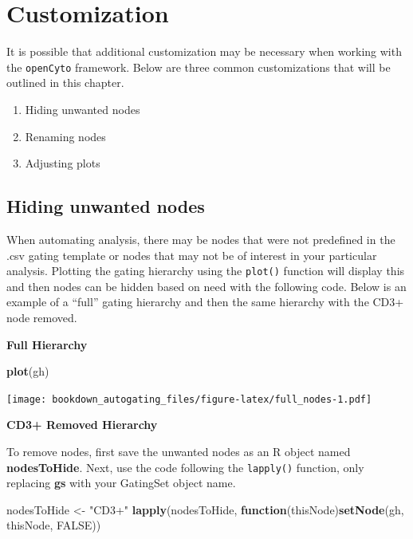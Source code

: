 \documentclass[]{book}
\newenvironment{Shaded}{\begin{snugshade}}{\end{snugshade}}
\newcommand{\ControlFlowTok}[1]{\textcolor[rgb]{0.13,0.29,0.53}{\textbf{#1}}}
\newcommand{\KeywordTok}[1]{\textcolor[rgb]{0.13,0.29,0.53}{\textbf{#1}}}
\newcommand{\NormalTok}[1]{#1}
\newcommand{\OtherTok}[1]{\textcolor[rgb]{0.56,0.35,0.01}{#1}}
\newcommand{\StringTok}[1]{\textcolor[rgb]{0.31,0.60,0.02}{#1}}
\providecommand{\tightlist}{%
  \setlength{\itemsep}{0pt}\setlength{\parskip}{0pt}}
\begin{document}
\hypertarget{customization}{%
\chapter{Customization}\label{customization}}

It is possible that additional customization may be necessary when working with the \texttt{openCyto} framework. Below are three common customizations that will be outlined in this chapter.

\begin{enumerate}
\def\labelenumi{\arabic{enumi}.}
\tightlist
\item
  Hiding unwanted nodes
\item
  Renaming nodes
\item
  Adjusting plots
\end{enumerate}

\hypertarget{hiding-unwanted-nodes}{%
\section{Hiding unwanted nodes}\label{hiding-unwanted-nodes}}

When automating analysis, there may be nodes that were not predefined in the .csv gating template or nodes that may not be of interest in your particular analysis. Plotting the gating hierarchy using the \texttt{plot()} function will display this and then nodes can be hidden based on need with the following code. Below is an example of a ``full'' gating hierarchy and then the same hierarchy with the CD3+ node removed.

\textbf{Full Hierarchy}

\begin{Shaded}
\begin{Highlighting}[]
\KeywordTok{plot}\NormalTok{(gh)}
\end{Highlighting}
\end{Shaded}

\texttt{[image: bookdown\_autogating\_files/figure-latex/full\_nodes-1.pdf]}

\textbf{CD3+ Removed Hierarchy}

To remove nodes, first save the unwanted nodes as an R object named \textbf{nodesToHide}. Next, use the code following the \texttt{lapply()} function, only replacing \textbf{gs} with your GatingSet object name.

\begin{Shaded}
\begin{Highlighting}[]
\NormalTok{nodesToHide <-}\StringTok{ "CD3+"}
\KeywordTok{lapply}\NormalTok{(nodesToHide, }\ControlFlowTok{function}\NormalTok{(thisNode)}\KeywordTok{setNode}\NormalTok{(gh, thisNode, }\OtherTok{FALSE}\NormalTok{))}
\end{Highlighting}
\end{Shaded}
\end{document}
